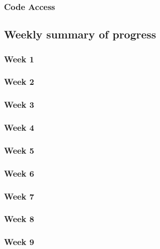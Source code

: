 \documentclass[onecolumn, draftclsnofoot,10pt, compsoc]{article}
\begin{document}
	    \subsubsection{Code Access}
	
	\subsection{Weekly summary of progress}
	
		\subsubsection{Week 1}
		
		\subsubsection{Week 2}
		
		\subsubsection{Week 3}
		
		\subsubsection{Week 4}
		
		\subsubsection{Week 5}
		
		\subsubsection{Week 6}
		
		\subsubsection{Week 7}
		
		\subsubsection{Week 8}
		
		\subsubsection{Week 9}
		
\end{document}
